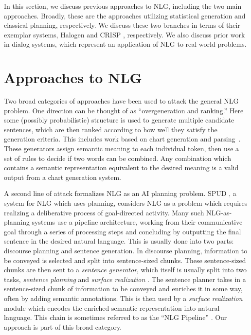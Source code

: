 In this section, we discuss previous approaches to NLG, including
the two main approaches.  Broadly, these are the
approaches utilizing statistical generation and classical planning,
respectively.  We discuss these two branches in terms of their
exemplar systems, Halogen \cite{langkilde_2002_halogen}
and CRISP \cite{koller_sentence_2007}, respectively.
We also discuss prior work in dialog systems,
which represent an application of NLG to
real-world problems.

\section{Approaches to NLG}
Two broad categories of
approaches have been used to attack the general NLG problem. One
direction can be thought of as ``overgeneration and ranking.'' Here
some (possibly probabilistic) structure is used to generate multiple
candidate sentences, which are then ranked according to how well they
satisfy the generation criteria. This includes work based on chart
generation and
parsing~\cite{shieber_uniform_1988,kay_chart_1996}. These generators
assign semantic meaning to each individual token, then use a set of
rules to decide if two words can be combined.  Any combination which
contains a semantic representation equivalent to the desired meaning 
is a valid output from a chart generation
system.

A second line of attack formalizes NLG as an AI planning problem.
SPUD \cite{stone_2003_spud}, a system for NLG which uses planning,
considers NLG as a problem which requires realizing a deliberative
process of goal-directed activity.  Many such NLG-as-planning systems
use a pipeline architecture, working from their communicative goal
through a series of processing steps and concluding by outputting the
final sentence in the desired natural language. This is usually done
into two parts:
discourse planning and sentence generation. In
discourse planning, information to be conveyed is selected and split
into sentence-sized chunks. These sentence-sized chunks are then sent
to a {\em sentence generator}, which itself is usually split into two
tasks, {\em sentence planning} and {\em surface realization}
\cite{koller_experiences_2011}.  The sentence planner takes in a
sentence-sized chunk of information to be conveyed and enriches it in
some way, often by adding semantic annotations.  
This is then used by a {\em surface realization}
module which encodes the enriched semantic representation into 
 natural language.  This chain is sometimes referred to as the
``NLG Pipeline'' \cite{reiter_building_2000}.  Our approach is
part of this broad category.


